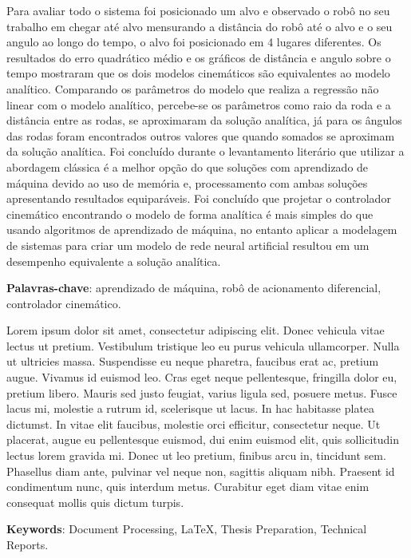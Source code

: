 Para avaliar todo o sistema foi posicionado um alvo e observado o robô no 
seu trabalho em chegar até alvo mensurando a distância do robô até o
alvo e o seu angulo ao longo do tempo, o alvo foi posicionado em 4 lugares
diferentes. Os resultados do erro quadrático médio e os
gráficos de distância e angulo sobre o tempo 
mostraram que os dois modelos cinemáticos são equivalentes ao modelo
analítico. Comparando os parâmetros do modelo que realiza a
regressão não linear com o modelo analítico,
percebe-se os parâmetros como raio da roda e a distância entre as rodas,
se aproximaram da solução analítica, já para os ângulos das rodas foram
encontrados outros valores que quando somados se aproximam da solução
analítica. Foi concluído durante o levantamento literário que
utilizar a abordagem clássica é a melhor opção do que soluções com
aprendizado de máquina devido ao uso de memória e,
processamento com ambas soluções apresentando resultados equiparáveis.
Foi concluído que projetar o controlador cinemático encontrando o modelo
de forma analítica é mais simples do que usando algoritmos de aprendizado
de máquina, no entanto aplicar a modelagem  de sistemas para criar um
modelo de rede neural artificial resultou em um desempenho equivalente
a solução analítica.




\vspace{1.5ex}

{\bf Palavras-chave}: aprendizado de máquina, robô de acionamento diferencial,
controlador cinemático.

%
%

Lorem ipsum dolor sit amet, consectetur adipiscing elit. Donec vehicula vitae lectus ut pretium. Vestibulum tristique leo eu purus vehicula ullamcorper. Nulla ut ultricies massa. Suspendisse eu neque pharetra, faucibus erat ac, pretium augue. Vivamus id euismod leo. Cras eget neque pellentesque, fringilla dolor eu, pretium libero. Mauris sed justo feugiat, varius ligula sed, posuere metus. Fusce lacus mi, molestie a rutrum id, scelerisque ut lacus. In hac habitasse platea dictumst. In vitae elit faucibus, molestie orci efficitur, consectetur neque. Ut placerat, augue eu pellentesque euismod, dui enim euismod elit, quis sollicitudin lectus lorem gravida mi. Donec ut leo pretium, finibus arcu in, tincidunt sem. Phasellus diam ante, pulvinar vel neque non, sagittis aliquam nibh. Praesent id condimentum nunc, quis interdum metus. Curabitur eget diam vitae enim consequat mollis quis dictum turpis.

\vspace{1.5ex}

{\bf Keywords}: Document Processing, \LaTeX, Thesis Preparation,
Technical Reports.
